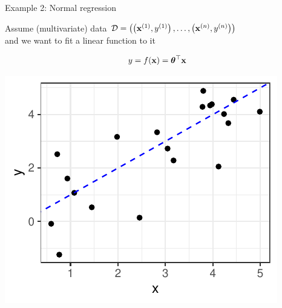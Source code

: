 \documentclass[11pt,compress,t,notes=noshow, xcolor=table]{beamer}
\begin{document}
\begin{vbframe}{Example 2: Normal regression}

Assume (multivariate) data $\mathcal{D} = \left( \left(\mathbf{x}^{(1)}, y^{(1)}\right), \ldots, \left(\mathbf{x}^{(n)}, y^{(n)}\right)\right)$ \\
and we want to fit a linear function to it

$$
y = f(\mathbf{x}) = \bm{\theta}^\top \mathbf{x} 
$$

\begin{center}
	\includegraphics[height=0.4\textwidth, keepaspectratio]{figure_man/ml_linreg_example_1.pdf} 
\end{center}



\end{vbframe}
\end{document}
